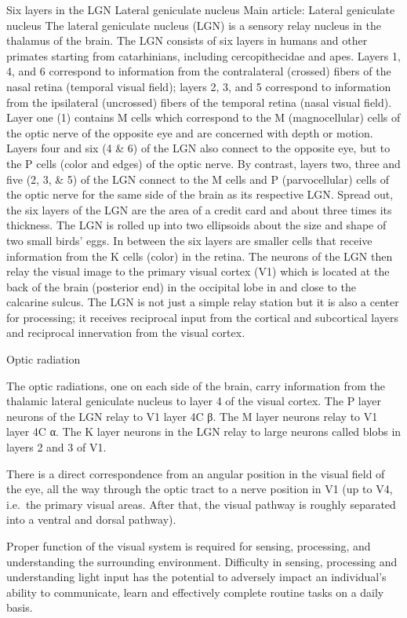 Six layers in the LGN
Lateral geniculate nucleus
Main article: Lateral geniculate nucleus
The lateral geniculate nucleus (LGN) is a sensory relay nucleus in the thalamus of the brain. The LGN consists of six layers in humans and other primates starting from catarhinians, including cercopithecidae and apes. Layers 1, 4, and 6 correspond to information from the contralateral (crossed) fibers of the nasal retina (temporal visual field); layers 2, 3, and 5 correspond to information from the ipsilateral (uncrossed) fibers of the temporal retina (nasal visual field). Layer one (1) contains M cells which correspond to the M (magnocellular) cells of the optic nerve of the opposite eye and are concerned with depth or motion. Layers four and six (4 \& 6) of the LGN also connect to the opposite eye, but to the P cells (color and edges) of the optic nerve. By contrast, layers two, three and five (2, 3, \& 5) of the LGN connect to the M cells and P (parvocellular) cells of the optic nerve for the same side of the brain as its respective LGN. Spread out, the six layers of the LGN are the area of a credit card and about three times its thickness. The LGN is rolled up into two ellipsoids about the size and shape of two small birds' eggs. In between the six layers are smaller cells that receive information from the K cells (color) in the retina. The neurons of the LGN then relay the visual image to the primary visual cortex (V1) which is located at the back of the brain (posterior end) in the occipital lobe in and close to the calcarine sulcus. The LGN is not just a simple relay station but it is also a center for processing; it receives reciprocal input from the cortical and subcortical layers and reciprocal innervation from the visual cortex.

Optic radiation

The optic radiations, one on each side of the brain, carry information from the thalamic lateral geniculate nucleus to layer 4 of the visual cortex. The P layer neurons of the LGN relay to V1 layer 4C β. The M layer neurons relay to V1 layer 4C α. The K layer neurons in the LGN relay to large neurons called blobs in layers 2 and 3 of V1.

There is a direct correspondence from an angular position in the visual field of the eye, all the way through the optic tract to a nerve position in V1 (up to V4, i.e.~the primary visual areas. After that, the visual pathway is roughly separated into a ventral and dorsal pathway).

Proper function of the visual system is required for sensing, processing, and understanding the surrounding environment. Difficulty in sensing, processing and understanding light input has the potential to adversely impact an individual's ability to communicate, learn and effectively complete routine tasks on a daily basis.

